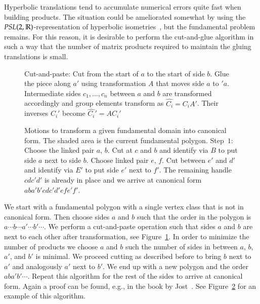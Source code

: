 \documentclass[Thesis]{subfiles}
\begin{document}
Hyperbolic translations tend to accumulate numerical errors quite fast when
building products. The situation could be ameliorated somewhat by using
the $PSL(2,\mathbb R)$-representation of hyperbolic
isometries~\cite{Floyd2002}, but the fundamental problem remains. For
this reason, it is desirable to perform the cut-and-glue algorithm in
such a way that the number of matrix products required to maintain the
gluing translations is small. 

%

\begin{figure}
\centering
\resizebox{0.4\textwidth}{!} {

}
\caption{Cut-and-paste: Cut from the start of $a$ to the start of side $b$. Glue the piece along $a'$ using transformation $A$ that moves side $a$ to $'a$. Intermediate sides $c_1,\ldots,c_n$ between $a$ and $b$ are transformed accordingly and group elements transform as $\hat{C_i}=C_iA'$. Their inverses $C_i'$ become $\hat{C_i}'=AC_i'$}
\label{fig:cut-and-paste-canonical}
\end{figure}

 \begin{figure}
 \centering
 \caption{Motions to transform a given fundamental domain into canonical form. The shaded area is the current fundamental polygon. Step~$1$: Choose the linked pair $a$, $b$. Cut at $c$ and $b$ and identify via $B$ to put side $a$ next to side $b$. Choose linked pair $e$, $f$. Cut between $e'$ and $d'$ and identify via $E'$ to put side $e'$ next to $f'$. The remaining handle $cdc'd'$ is already in place and we arrive at canonical form $aba'b'cdc'd'efe'f'$.}
 \label{fig:canonical_algorithm}
 \end{figure}

 We start with a fundamental polygon with a single vertex class that is not in canonical form. 
 Then choose sides $a$ and $b$ such that the order in the polygon is $a\cdots b \cdots a' \cdots b' \cdots$. 
 We perform a cut-and-paste operation such that sides $a$ and $b$ are next to each other after transformation, see Figure~\ref{fig:cut-and-paste-canonical}. 
 In order to minimize the number of products we choose $a$ and $b$ such the number of sides in between $a$, $b$, $a'$, and $b'$ is minimal. 
 We proceed cutting as described before to bring $b$ next to $a'$ and analogously $a'$ next to $b'$. 
 We end up with a new polygon and the order $aba'b'\cdots$. 
 Repeat this algorithm for the rest of the sides to arrive at canonical form. 
 Again a proof can be found, e.g., in the book by Jost~\cite{Jost2007}.
 See Figure~\ref{fig:canonical_algorithm} for an example of this algorithm.
\end{document}
